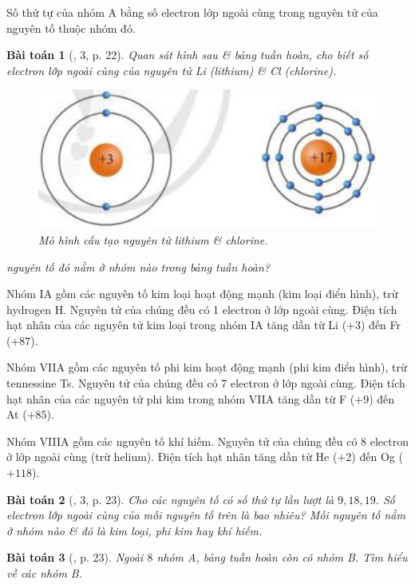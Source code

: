 \documentclass{article}
\newtheorem{baitoan}{Bài toán}
\begin{document}
Số thứ tự của nhóm A bằng số electron lớp ngoài cùng trong nguyên tử của nguyên tố thuộc nhóm đó.

\begin{baitoan}[\cite{SGK_KHTN_7_Canh_Dieu}, 3, p. 22]
	Quan sát hình sau \& bảng tuần hoàn, cho biết số electron lớp ngoài cùng của nguyên tử \emph{Li} (lithium) \& \emph{Cl} (chlorine).
	\begin{figure}[H]
		\centering
		\includegraphics[scale=0.3]{lithium_chlorine}
		\caption{Mô hình cấu tạo nguyên tử lithium \& chlorine.}
	\end{figure}
	 nguyên tố đó nằm ở nhóm nào trong bảng tuần hoàn?
\end{baitoan}
Nhóm IA gồm các nguyên tố kim loại hoạt động mạnh (kim loại điển hình), trừ hydrogen H. Nguyên tử của chúng đều có 1 electron ở lớp ngoài cùng. Điện tích hạt nhân của các nguyên tử kim loại trong nhóm IA tăng dần từ Li ($+3$) đến Fr ($+87$).

Nhóm VIIA gồm các nguyên tố phi kim hoạt động mạnh (phi kim điển hình), trừ tennessine Ts. Nguyên tử của chúng đều có 7 electron ở lớp ngoài cùng. Điện tích hạt nhân của các nguyên tử phi kim trong nhóm VIIA tăng dần từ F ($+9$) đến At ($+85$).

Nhóm VIIIA gồm các nguyên tố khí hiếm. Nguyên tử của chúng đều có 8 electron ở lớp ngoài cùng (trừ helium). Điện tích hạt nhân tăng dần từ He ($+2$) đến Og ($+118$).

\begin{baitoan}[\cite{SGK_KHTN_7_Canh_Dieu}, 3, p. 23]
	Cho các nguyên tố có số thứ tự lần lượt là $9,18,19$. Số electron lớp ngoài cùng của mỗi nguyên tố trên là bao nhiêu? Mỗi nguyên tố nằm ở nhóm nào \& đó là kim loại, phi kim hay khí hiếm.
\end{baitoan}

\begin{baitoan}[\cite{SGK_KHTN_7_Canh_Dieu}, p. 23]
	Ngoài $8$ nhóm A, bảng tuần hoàn còn có nhóm B. Tìm hiểu về các nhóm B.
\end{baitoan}
\end{document}

